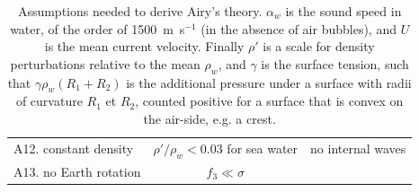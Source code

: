 \begin{table}
\begin{tabular}{lcc}
 A12. constant density & $\rho'/\rho_w < 0.03$ for sea water   & no internal waves\\
 A13. no Earth rotation  & $f_3 \ll \sigma $          & \\
 \hline
\end{tabular}
  \caption{Assumptions needed to derive Airy's theory. $ \alpha_w$ is the sound speed in water, of the order of 
1500~m~s$^{-1}$ (in the absence of air bubbles), and $U$ is the mean current velocity. Finally $\rho'$ 
is a scale for density perturbations relative to the mean $\rho_w$, and 
 $\gamma$ is the surface tension, such that $\gamma \rho_w (R_1+R_2)$ is the additional pressure under a surface with radii of 
curvature $R_1$ et $R_2$, counted positive for a surface that is convex on the air-side, e.g. a crest.}\label{table_H}
\end{table}

